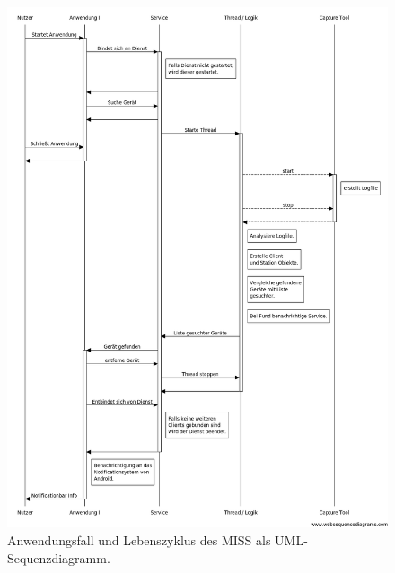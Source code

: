 \documentclass[]{report}
\begin{document}
\begin{figure}[h!]
    \centering 
    \includegraphics[width=5.0in]{bilder/uml.png}
    \caption{Anwendungsfall und Lebenszyklus des MISS als UML-Sequenzdiagramm.}
    \label{fig:uml}
\end{figure}
\end{document}
